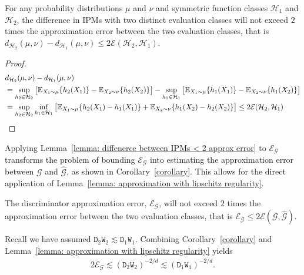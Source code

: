 \begin{lemma}\label{lemma: diffenerce between IPMs < 2 approx error}
For any probability distributions $\mu$ and $\nu$ and symmetric function classes $\mathcal{H}_1$ and $\mathcal{H}_2$, the difference in IPMs with two distinct evaluation classes will not exceed $2$ times the approximation error between the two evaluation classes, that is $d_{\mathcal{H}_2}(\mu, \nu) - d_{\mathcal{H}_1}(\mu, \nu)\leq 2\mathcal{E}(\mathcal{H}_2, \mathcal{H}_1)$.
\end{lemma}
\begin{proof}
     \begin{align*}
        &d_{\mathcal{H}_2}(\mu, \nu) - d_{\mathcal{H}_1}(\mu, \nu) \\
        &=   \sup_{h_2 \in \mathcal{H}_2}\big[\mathbb{E}_{X_1 \sim \mu} \{h_2(X_1)\} - \mathbb{E}_{X_2\sim\nu} \{h_2(X_2)\}\big] - \sup_{h_1 \in \mathcal{H}_1}\big[\mathbb{E}_{X_1 \sim \mu} \{h_1(X_1)\} - \mathbb{E}_{X_2\sim\nu} \{h_1(X_2)\}\big]\\
        &=\sup_{h_2 \in \mathcal{H}_2}\inf_{h_1 \in \mathcal{H}_1}\big[\mathbb{E}_{X_1 \sim \mu} \{h_2(X_1) - h_1(X_1)\} + \mathbb{E}_{X_2\sim\nu}\{h_1(X_2) - h_2(X_2)\}\big] \leq 2\mathcal{E}(\mathcal{H}_2, \mathcal{H}_1)
    \end{align*}
\end{proof}
Applying Lemma~\ref{lemma: diffenerce between IPMs < 2 approx error} to $\mathcal{E}_{\mathcal{G}}$ transforms the problem of bounding $\mathcal{E}_{\mathcal{G}}$  into estimating the approximation error between $\mathcal{G}$ and $\widehat{\mathcal{G}}$, as shown in Corollary~\ref{corollary}. This allows for the direct application of Lemma~\ref{lemma: approximation with lipschitz regularity}.
\begin{corollary}\label{corollary}
    The discriminator approximation error, $\mathcal{E}_{\mathcal{G}}$, will not exceed $2$ times the approximation error between the two evaluation classes, that is $\mathcal{E}_{\mathcal{G}} \leq 2\mathcal{E}(\mathcal{G}, \widehat{\mathcal{G}})$.
\end{corollary}

Recall we have assumed $\mathtt{D}_2\mathtt{W}_2\lesssim \mathtt{D}_1\mathtt{W}_1$. Combining Corollary~\ref{corollary} and Lemma~\ref{lemma: approximation with lipschitz regularity} yields
\begin{align*}
    2\mathcal{E}_{\mathcal{G}} \lesssim (\mathtt{D}_2\mathtt{W}_2)^{-2/d} \lesssim (\mathtt{D}_1\mathtt{W}_1)^{-2/d}.
\end{align*}

